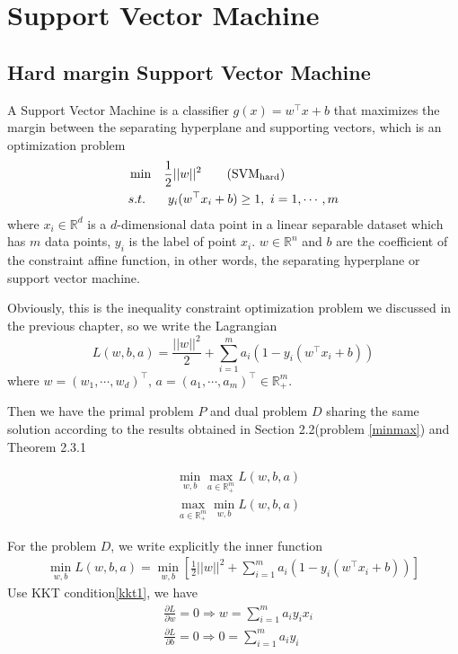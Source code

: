 \documentclass[a4paper]{report}
\begin{document}
\chapter{Support Vector Machine}
\section{Hard margin Support Vector Machine}

A Support Vector Machine is a classifier $g(x)= w^\top x + b $ that maximizes the margin between the separating hyperplane and supporting vectors\cite{cortes1995support}, which is an optimization problem 
\begin{align*}
    &\min& & \frac{1}{2}||w||^2 \label{svmhard}\tag{$\mathrm{SVM_{hard}}$}\\
    &s.t.& & \ y_i(w^\top x_i+b)\geq 1, \ i=1,\cdots,m
\end{align*}
where $x_i\in \mathbb R^d$ is a $d$-dimensional data point in a linear separable dataset which has $m$ data points, $y_i$ is the label of point $x_i$. $w\in \mathbb R^n$ and $b$ are the coefficient of the constraint affine function, in other words, the separating hyperplane or support vector machine. 

Obviously, this is the inequality constraint optimization problem we discussed in the previous chapter, so we write the Lagrangian
\[
    L(w,b,a)=\frac{||w||^2}{2}+\sum_{i=1}^m a_i(1-y_i(w^\top x_i+b))
\]
where $w=(w_1,\cdots,w_d)^\top$, $a=(a_1,\cdots,a_m)^\top\in\mathbb R_+^m$.

Then we have the primal problem $P$ and dual problem $D$ sharing the same solution according to the results obtained in Section 2.2(problem \ref{minmax}) and Theorem 2.3.1

\begin{align}
    &\min_{w,b} \max_{a\in\mathbb R_+^m} L(w,b,a) \tag{P}\\
    &\max_{a\in\mathbb R_+^m} \min_{w,b} L(w,b,a) \tag{D}
\end{align}

For the problem $D$, we write explicitly the inner function
\begin{align}
    \min_{w,b} L(w,b,a)=\min_{w,b}[\frac{1}{2}||w||^2+\sum_{i=1}^m a_i(1-y_i(w^\top x_i+b))]
\end{align}
Use KKT condition\ref{kkt1}, we have
\begin{align}
    &\frac{\partial L}{\partial w}=0\Rightarrow w=\sum_{i=1}^m a_i y_i x_i\\
    &\frac{\partial L}{\partial b}=0\Rightarrow 0=\sum_{i=1}^m a_i y_i
\end{align}
\end{document}
